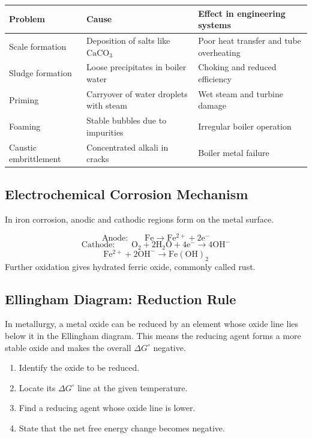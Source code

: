 \documentclass[12pt,a4paper]{article}
\begin{document}
\begin{tabularx}{\linewidth}{|B{3.2cm}|Y|Y|}
\hline
\textbf{Problem} & \textbf{Cause} & \textbf{Effect in engineering systems} \\
\hline
Scale formation & Deposition of salts like $\mathrm{CaCO_3}$ & Poor heat transfer and tube overheating \\
\hline
Sludge formation & Loose precipitates in boiler water & Choking and reduced efficiency \\
\hline
Priming & Carryover of water droplets with steam & Wet steam and turbine damage \\
\hline
Foaming & Stable bubbles due to impurities & Irregular boiler operation \\
\hline
Caustic embrittlement & Concentrated alkali in cracks & Boiler metal failure \\
\hline
\end{tabularx}

\subsection{Electrochemical Corrosion Mechanism}
In iron corrosion, anodic and cathodic regions form on the metal surface.

\begin{tcolorbox}[formulabox, title={Rusting Half-Reactions}]
\[
\text{Anode:}\qquad \mathrm{Fe\rightarrow Fe^{2+}+2e^-}
\]
\[
\text{Cathode:}\qquad \mathrm{O_2+2H_2O+4e^-\rightarrow4OH^-}
\]
\[
\mathrm{Fe^{2+}+2OH^-\rightarrow Fe(OH)_2}
\]
Further oxidation gives hydrated ferric oxide, commonly called rust.
\end{tcolorbox}

\subsection{Ellingham Diagram: Reduction Rule}
In metallurgy, a metal oxide can be reduced by an element whose oxide line lies below it in the Ellingham diagram. This means the reducing agent forms a more stable oxide and makes the overall $\Delta G^\circ$ negative.

\begin{tcolorbox}[masonbox, title={Answer-Writing Pattern for Ellingham Problems}]
\begin{enumerate}[leftmargin=*, itemsep=3pt, topsep=2pt]
  \item Identify the oxide to be reduced.
  \item Locate its $\Delta G^\circ$ line at the given temperature.
  \item Find a reducing agent whose oxide line is lower.
  \item State that the net free energy change becomes negative.
\end{enumerate}
\end{tcolorbox}
\end{document}
